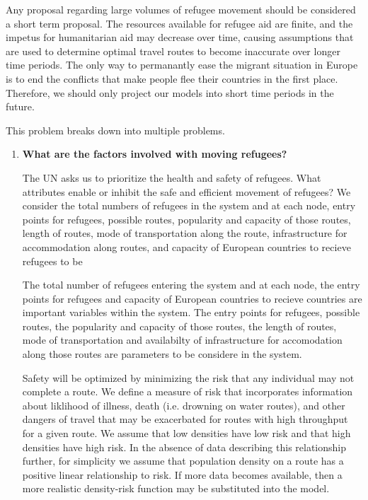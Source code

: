 \documentclass{article}
\begin{document}
Any proposal regarding large volumes of refugee movement should be considered a short term proposal. The resources available for refugee aid are finite, and the impetus for humanitarian aid may decrease over time, causing assumptions that are used to determine optimal travel routes to become inaccurate over longer time periods. The only way to permanantly ease the migrant situation in Europe is to end the conflicts that make people flee their countries in the first place. Therefore, we should only project our models into short time periods in the future.

This problem breaks down into multiple problems.

\begin{enumerate}
    \item {\bf What are the factors involved with moving refugees?}

    The UN asks us to prioritize the health and safety of refugees. What attributes enable or inhibit the safe and efficient movement of refugees? We consider the total numbers of refugees in the system and at each node, entry points for refugees, possible routes, popularity and capacity of those routes, length of routes, mode of transportation along the route, infrastructure for accommodation along routes, and capacity of European countries to recieve refugees to be 

    The total number of refugees entering the system and at each node, the entry points for refugees and capacity of European countries to recieve countries are important variables within the system. The entry points for refugees, possible routes, the popularity and capacity of those routes, the length of routes, mode of transportation and availabilty of infrastructure for accomodation along those routes are parameters to be considere in the system.

    Safety will be optimized by minimizing the risk that any individual may not complete a route. We define a measure of risk that incorporates information about liklihood of illness, death (i.e. drowning on water routes), and other dangers of travel that may be exacerbated for routes with high throughput for a given route. We assume that low densities have low risk and that high densities have high risk. In the absence of data describing this relationship further, for simplicity we assume that population density on a route has a positive linear relationship to risk. If more data becomes available, then a more realistic density-risk function may be substituted into the model.


\end{enumerate}
\end{document}
